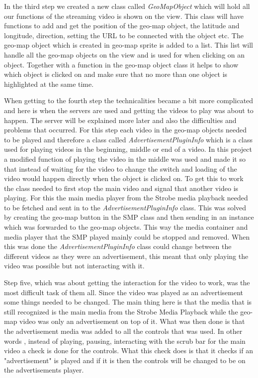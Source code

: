 \documentclass[9pt,a4paper]{acmproc}
\begin{document}
In the third step we created a new class called \textit{GeoMapObject} which will hold all our functions of the streaming video is shown on the view. This class will have functions to add and get the position of the geo-map object, the latitude and longitude, direction, setting the URL to be connected with the object etc. The geo-map object which is created in geo-map sprite is added to a list. This list will handle all the geo-map objects on the view and is used for when clicking on an object. Together with a function in the geo-map object class it helps to show which object is clicked on and make sure that no more than one object is highlighted at the same time.

When getting to the fourth step the technicalities became a bit more complicated and here is when the servers are used and getting the videos to play was about to happen. The server will be explained more later and also the difficulties and problems that occurred. For this step each video in the geo-map objects needed to be played and therefore a class called   \textit{AdvertisementPluginInfo} which is a class used for playing videos in the beginning, middle or end of a video. In this project a modified function of playing the video in the middle was used and made it so that instead of waiting for the video to change the switch and loading of the video would happen directly when the object is clicked on. To get this to work the class needed to first stop the main video and signal that another video is playing. For this the main media player from the Strobe media playback needed to be fetched and sent in to the \textit{AdvertisementPluginInfo} class. This was solved by creating the geo-map button in the SMP class and then sending in an instance which was forwarded to the geo-map objects. This way the media container and media player that the SMP played mainly could be stopped and removed. When this was done the \textit{AdvertisementPluginInfo} class could change between the different videos as they were an advertisement, this meant that only playing the video was possible but not interacting with it.

Step five, which was about getting the interaction for the video to work, was the most difficult task of them all. Since the video was played as an advertisement some things needed to be changed. The main thing here is that the media that is still recognized is the main media from the Strobe Media Playback while the geo-map video was only an advertisement on top of it. What was then done is that the advertisement media was added to all the controls that was used. In other words , instead of playing, pausing, interacting with the scrub bar for the main video a check is done for the controls. What this check does is that it checks if an "advertisement" is played and if it is then the controls will be changed to be on the advertisements player.
\end{document}
